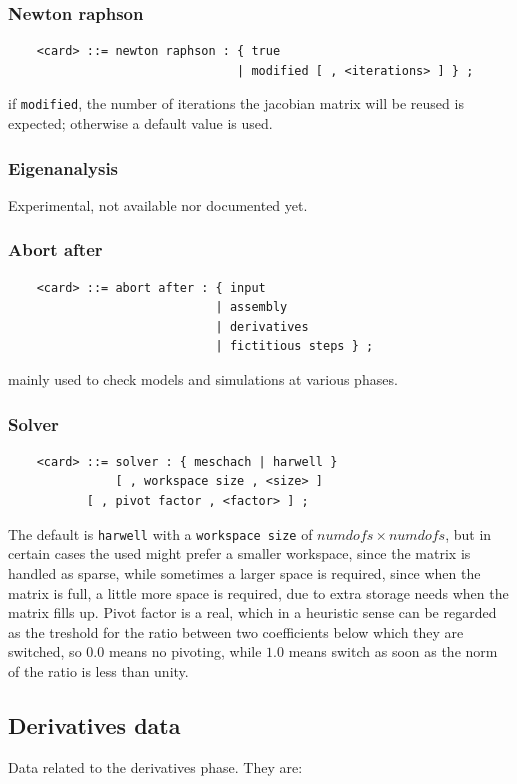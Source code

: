 \documentclass[10pt,dvips]{report}
\begin{document}
\subsubsection{Newton raphson}
\begin{verbatim}
    <card> ::= newton raphson : { true 
                                | modified [ , <iterations> ] } ;
\end{verbatim}
if {\tt modified}, the number of iterations the jacobian matrix will be
reused is expected; otherwise a default value is used.

\subsubsection{Eigenanalysis}
Experimental, not available nor documented yet.

\subsubsection{Abort after}
\begin{verbatim}
    <card> ::= abort after : { input 
                             | assembly 
                             | derivatives 
                             | fictitious steps } ;
\end{verbatim}
mainly used to check models and simulations at various phases.

\subsubsection{Solver}   
\begin{verbatim}
    <card> ::= solver : { meschach | harwell }
               [ , workspace size , <size> ] 
	       [ , pivot factor , <factor> ] ;
\end{verbatim}
The default is {\tt harwell} with a {\tt workspace size}
of $ numdofs\times{numdofs} $, but in certain cases the used
might prefer a smaller workspace, since the matrix is handled as sparse,
while sometimes a larger space is required, since when the matrix is
full, a little more space is required, due to extra storage needs when
the matrix fills up.
Pivot factor is a real, which in a heuristic sense can be regarded as
the treshold for the ratio between two coefficients below which they are
switched, so $ 0.0 $ means no pivoting, while $ 1.0 $ means switch as
soon as the norm of the ratio is less than unity.



\subsection{Derivatives data}
Data related to the derivatives phase. They are:
\end{document}
